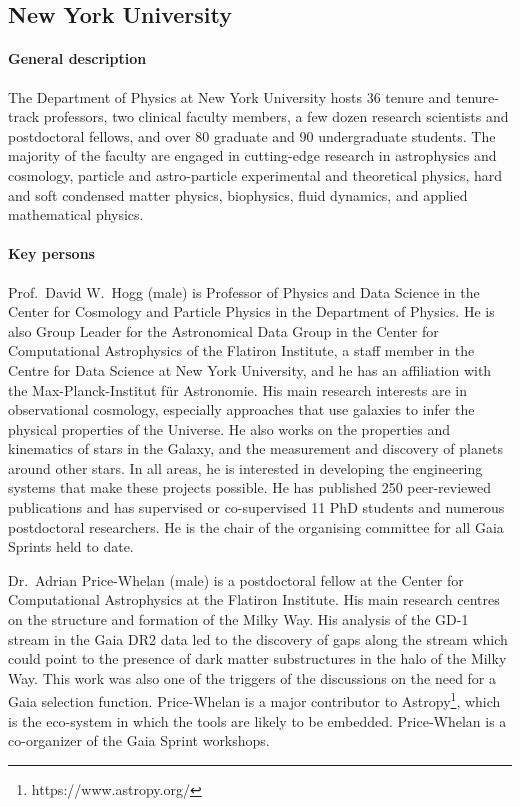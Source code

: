 \subsection{New York University}
\label{sec:nyu}

\paragraph{General description}

The Department of Physics at New York University hosts 36 tenure and tenure-track professors, two clinical faculty members, a few dozen research scientists and postdoctoral fellows, and over 80 graduate and 90 undergraduate students. The majority of the faculty are engaged in cutting-edge research in astrophysics and cosmology, particle and astro-particle experimental and theoretical physics, hard and soft condensed matter physics, biophysics, fluid dynamics, and applied mathematical physics.

\paragraph{Key persons}
Prof.~David W.~Hogg (male) is Professor of Physics and Data Science in the Center for Cosmology and Particle Physics in the Department of Physics. He is also Group Leader for the Astronomical Data Group in the Center for Computational Astrophysics of the Flatiron Institute, a staff member in the Centre for Data Science at New York University, and he has an affiliation with the Max-Planck-Institut für Astronomie. His main research interests are in observational cosmology, especially approaches that use galaxies to infer the physical properties of the Universe. He also works on the properties and kinematics of stars in the Galaxy, and the measurement and discovery of planets around other stars. In all areas, he is interested in developing the engineering systems that make these projects possible. He has published 250 peer-reviewed publications and has supervised or co-supervised 11 PhD students and numerous postdoctoral researchers. He is the chair of the organising committee for all Gaia Sprints held to date.

Dr.~Adrian Price-Whelan (male) is a postdoctoral fellow at the Center for Computational Astrophysics at the Flatiron Institute. His main research centres on the structure and formation of the Milky Way. His analysis of the GD-1 stream in the Gaia DR2 data led to the discovery of gaps along the stream which could point to the presence of dark matter substructures in the halo of the Milky Way\cite{2018ApJ...863L..20P,2019ApJ...880...38B}. This work was also one of the triggers of the discussions on the need for a Gaia selection function. Price-Whelan is a major contributor to Astropy\footnote{https://www.astropy.org/}, which is the eco-system in which the {\acro} tools are likely to be embedded. Price-Whelan is a co-organizer of the Gaia Sprint workshops.

